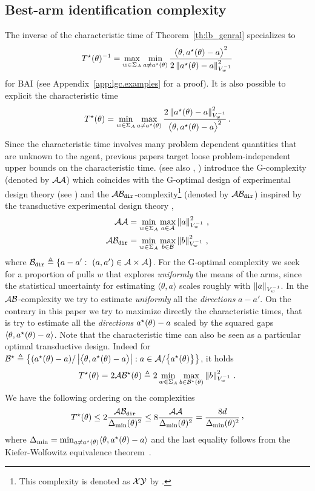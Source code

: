 \subsection{Best-arm identification complexity}
The inverse of the characteristic time of Theorem~\ref{th:lb_genral} specializes to
\[
T^{\star}(\theta)^{-1} = \max_{w\in\Sigma_A} \min_{a\neq a^\star(\theta)} \frac{\big\langle \theta, a^\star(\theta)-a\big\rangle^2}{2 \left\lVert a^\star(\theta)-a\right\rVert_{V_w^{-1}}^2}
\]
for BAI (see Appendix~\ref{app:lgc.examples} for a proof). It is also possible to explicit the characteristic time
\[
T^{\star}(\theta) = \min_{w\in\Sigma_A} \max_{a\neq a^\star(\theta)} \frac{2\left\lVert a^\star(\theta)-a\right\rVert_{V_w^{-1}}^2}{\big\langle \theta, a^\star(\theta)-a\big\rangle^2}\,.
\]
Since the characteristic time involves many problem dependent quantities that are unknown to the agent, previous papers target loose problem-independent upper bounds on the characteristic time. \citet{soare2014linear} (see also \citealt{tao2018alba}, \citealt{fiez2019transductive}) introduce the G-complexity (denoted by $\mathcal{A}\mathcal{A}$) which coincides with the G-optimal design of experimental design theory (see \citealt{pukelsheim2006optimal}) and the $\mathcal{A}\mathcal{B}_{\texttt{dir}}$-complexity\footnote{This complexity is denoted as $\mathcal{X}\mathcal{Y}$ by \citet{soare2014linear}.} (denoted by $\mathcal{A}\mathcal{B}_{\texttt{dir}}$) inspired by the transductive experimental design theory  \citep{yu2006active},
\begin{align*}
\mathcal{A}\mathcal{A} &=\min_{w\in\Sigma_A} \max_{a\in\mathcal{A}} \left\lVert a\right\rVert_{V_w^{-1}}^2\,,\\
\mathcal{A}\mathcal{B}_{\texttt{dir}} &=\min_{w\in\Sigma_A} \max_{b\in\mathcal{B}} \left\lVert b\right\rVert_{V_w^{-1}}^2\,,
\end{align*}
where $\cB_{\texttt{dir}}\eqdef\{a-a':\ (a,a')\in\cA\times\cA\}$. For the G-optimal complexity we seek for a proportion of pulls $w$ that explores \emph{uniformly} the means of the arms, since the statistical uncertainty for estimating $\langle \theta,a\rangle$ scales roughly with $\left\lVert a\right\rVert_{V_w^{-1}}$. In the $\mathcal{A}\mathcal{B}$-complexity we try to estimate \emph{uniformly} all the \emph{directions} $a-a'$. On the contrary in this paper we try to maximize directly the characteristic times, that is try to estimate all the \emph{directions} $a^\star(\theta) - a$ scaled by the squared gaps $\langle\theta,a^\star(\theta)-a\rangle$.
Note that the characteristic time can also be seen as a particular optimal transductive design. Indeed for $\mathcal{B}^\star \triangleq \left\{ (a^\star(\theta)- a)/\left|\big\langle \theta, a^\star(\theta)-a\big\rangle\right|: a\in\mathcal{A}/\big\{a^\star(\theta)\big\}  \right\}$, it holds
\[
T^{\star}(\theta) = 2 \mathcal{A}\mathcal{B}^\star(\theta) \triangleq 2 \min_{w\in\Sigma_A} \max_{b\in\mathcal{B}^\star(\theta)} \left\lVert b\right\rVert_{V_w^{-1}}^2\,.
\]
We have the following ordering on the complexities
\begin{align}\label{eq:complexities}
\Tstar(\theta) \leq 2 \frac{\xyopt}{\DeltaMin(\theta)^2}\leq 8 \frac{\gopt}{\DeltaMin(\theta)^2} = \frac{8d}{\DeltaMin(\theta)^2}\,\CommaBin
\end{align}
where $\Delta_\text{min} = \min_{a\neq a^\star(\theta)}\langle\theta,a^\star(\theta)-a\rangle$ and  the last equality follows from the Kiefer-Wolfowitz equivalence theorem~\citep{kiefer1959}. 

